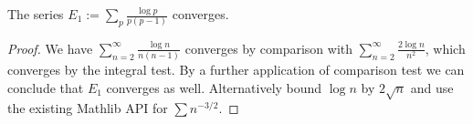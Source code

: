 \begin{proposition}[$E_1$ summable]
\label{E1_summable}
\leanok
The series $E_1 := \sum_p \frac{\log p}{p(p-1)}$ converges.
\end{proposition}
\begin{proof}
\leanok
We have $\sum_{n=2}^\infty \frac{\log n}{n(n-1)}$ converges by comparison with $\sum_{n=2}^\infty \frac{2\log n}{n^2}$, which converges by the integral test.  By a further application of comparison test we can conclude that $E_1$ converges as well.
  Alternatively bound $\log n$ by $2\sqrt n$ and use the existing Mathlib API for $\sum n^{-3/2}$.
\end{proof}
